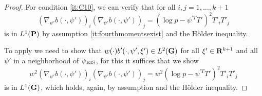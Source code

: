 \begin{proof}
    For condition \ref{it:C10}, we can verify that for all $i,j = 1,\dots, k+ 1$ 
    $$
        (\nabla_{\psi'} b(\cdot, \psi'))_{i}(\nabla_{\psi'} b(\cdot, \psi'))_{j} = \left( \log p - \psi^{\prime T}T' \right)^{2} T'_{i}T'_{j}
    $$
    is in $L^{1}(\P)$ by assumption \ref{it:fourthmomentsexist} and the Hölder inequality. 

    To apply  we need to show that $w(\cdot)b'(\cdot, \psi',\xi') \in L^{2}(\G)$ for all $\xi'\in\R^{k + 1}$ and all $\psi'$ in a neighborhood of $\peis$, for this it suffices that we show 
    $$
        w^{2}(\nabla_{\psi'} b(\cdot, \psi'))_{i}(\nabla_{\psi'} b(\cdot, \psi'))_{j} = w^{2}\left( \log p - \psi^{\prime T}T' \right)^{2} T'_{i}T'_{j}
    $$
    is in $L^{1}(\G)$, which holds, again, by assumption  and the Hölder inequality.


\end{proof}
